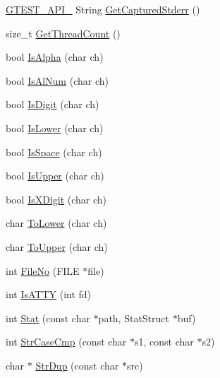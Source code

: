 \begin{DoxyCompactItemize}
\item 
\hyperlink{gtest-port_8h_aa73be6f0ba4a7456180a94904ce17790}{\-G\-T\-E\-S\-T\-\_\-\-A\-P\-I\-\_\-} \-String \hyperlink{namespacetesting_1_1internal_a70e6787ffdc73dd85d22cfaef51ade96}{\-Get\-Captured\-Stderr} ()
\item 
size\-\_\-t \hyperlink{namespacetesting_1_1internal_a1a64b279303ddd2280b7d7530f229daf}{\-Get\-Thread\-Count} ()
\item 
bool \hyperlink{namespacetesting_1_1internal_a820f82d00f792823c4ee5a7e8792d494}{\-Is\-Alpha} (char ch)
\item 
bool \hyperlink{namespacetesting_1_1internal_a86fb084b0b7eb55a84127f09f100d6ca}{\-Is\-Al\-Num} (char ch)
\item 
bool \hyperlink{namespacetesting_1_1internal_a14c103337b15023af223d62660d4412b}{\-Is\-Digit} (char ch)
\item 
bool \hyperlink{namespacetesting_1_1internal_a126278db8321717abc305370708e81c3}{\-Is\-Lower} (char ch)
\item 
bool \hyperlink{namespacetesting_1_1internal_ac2774601e1c8d09df5179723a5cecf69}{\-Is\-Space} (char ch)
\item 
bool \hyperlink{namespacetesting_1_1internal_a1687fe200fe268dc61a8cca69d84b81c}{\-Is\-Upper} (char ch)
\item 
bool \hyperlink{namespacetesting_1_1internal_a5611e6f84ecc52b421d9cd22f7e7842a}{\-Is\-X\-Digit} (char ch)
\item 
char \hyperlink{namespacetesting_1_1internal_a667501a50067ea0bc29309bd1d890676}{\-To\-Lower} (char ch)
\item 
char \hyperlink{namespacetesting_1_1internal_a8cdfff015b1271c328288e3880e1dc4d}{\-To\-Upper} (char ch)
\item 
int \hyperlink{namespacetesting_1_1internal_1_1posix_ad74bd19d3fa41052bbd53ec4ead31880}{\-File\-No} (\-F\-I\-L\-E $\ast$file)
\item 
int \hyperlink{namespacetesting_1_1internal_1_1posix_a95de7f4c27e0ed8d1b8a2dae5b8cd4aa}{\-Is\-A\-T\-T\-Y} (int fd)
\item 
int \hyperlink{namespacetesting_1_1internal_1_1posix_a2b61bd7c4e89210f1b7ef8be3decf6c8}{\-Stat} (const char $\ast$path, \-Stat\-Struct $\ast$buf)
\item 
int \hyperlink{namespacetesting_1_1internal_1_1posix_a4f3409b17d947f9e3a8f45d82ef6c862}{\-Str\-Case\-Cmp} (const char $\ast$s1, const char $\ast$s2)
\item 
char $\ast$ \hyperlink{namespacetesting_1_1internal_1_1posix_a95b18e04f2142b9e775030b633edc851}{\-Str\-Dup} (const char $\ast$src)

\end{DoxyCompactItemize}
